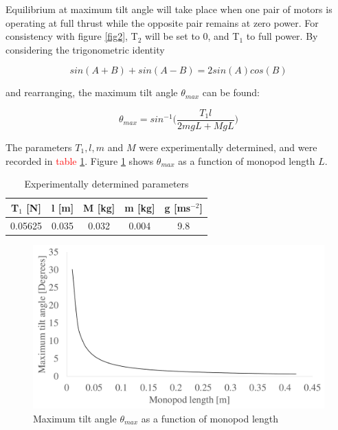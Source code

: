 \documentclass[12pt,a4paper]{article}
\begin{document}
Equilibrium at maximum tilt angle will take place when one pair of motors is operating at full thrust while the opposite pair remains at zero power. For consistency with figure \ref{fig2}, T$_{\text{2}}$ will be set to 0, and T$_{\text{1}}$ to full power. By considering the trigonometric identity

\begin{equation}
sin(A+B)+sin(A-B) = 2sin(A)cos(B)
\end{equation}

and rearranging, the maximum tilt angle $\theta_{max}$ can be found:

\begin{equation}
\theta_{max} = sin^{-1}\Big(\frac{T_1l}{2mgL + MgL}\Big)
\end{equation}

The parameters $T_{1}, l, m$ and $M$ were experimentally determined, and were recorded in \textcolor{red}{table \ref{table}}. Figure \ref{fig3} shows $\theta_{max}$ as a function of monopod length $L$.


\begin{table}[h!]
\centering
\label{table}
\begin{tabular}{@{}ccccc@{}}
\toprule
T$_{1}$ {[}N{]} & l {[}m{]} & M {[}kg{]} & m {[}kg{]} & g {[}ms$^{-2}${]} \\ \midrule
0.05625         & 0.035     & 0.032      & 0.004      & 9.8               \\ \bottomrule
\end{tabular}
\caption{Experimentally determined parameters}
\end{table}

\begin{figure}[h!]
\centering
 \includegraphics[scale=0.35]{TiltAngle.pdf}
  \caption{Maximum tilt angle $\theta_{max}$ as a function of monopod length}
  \label{fig3}
\end{figure}
\end{document}
